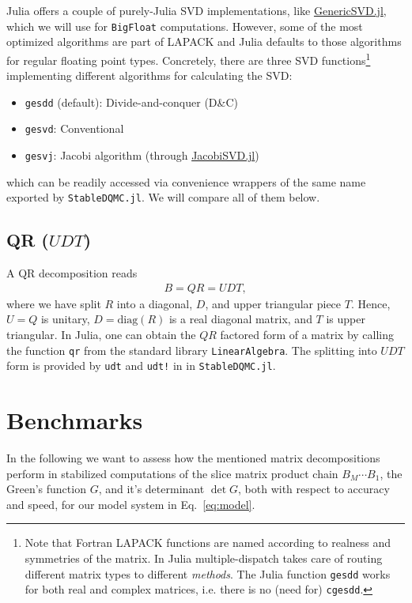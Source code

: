 \documentclass[%
 reprint,
superscriptaddress,
citeautoscript,
showpacs,
 amsmath,amssymb,
 aps,
 prb,
longbibliography,
]{revtex4-1}
\begin{document}
Julia offers a couple of purely-Julia SVD implementations, like \href{https://github.com/JuliaLinearAlgebra/GenericSVD.jl/}{GenericSVD.jl}, which we will use for \texttt{BigFloat} computations. However, some of the most optimized algorithms are part of LAPACK\cite{LAPACK} and Julia defaults to those algorithms for regular floating point types. Concretely, there are three SVD functions\footnote{Note that Fortran LAPACK functions are named according to realness and symmetries of the matrix. In Julia multiple-dispatch takes care of routing different matrix types to different \textit{methods}. The Julia function \texttt{gesdd} works for both real and complex matrices, i.e. there is no (need for) \texttt{cgesdd}.} implementing different algorithms for calculating the SVD:
\begin{itemize}
	\item \texttt{gesdd} (default): Divide-and-conquer (D\&C)
	\item \texttt{gesvd}: Conventional
	\item \texttt{gesvj}: Jacobi algorithm (through \href{https://github.com/RalphAS/JacobiSVD.jl}{JacobiSVD.jl})
\end{itemize}
which can be readily accessed via convenience wrappers of the same name exported by \texttt{StableDQMC.jl}. We will compare all of them below.

\subsection{QR ($UDT$)}
A QR decomposition reads
\begin{align}
B = QR = UDT,
\end{align}
where we have split $R$ into a diagonal, $D$, and upper triangular piece $T$. Hence, $U = Q$ is unitary, $D = \textrm{diag}(R)$ is a real diagonal matrix, and $T$ is upper triangular. In Julia, one can obtain the $QR$ factored form of a matrix by calling the function \texttt{qr} from the standard library \texttt{LinearAlgebra}. The splitting into $UDT$ form is provided by \texttt{udt} and \texttt{udt!} in in \texttt{StableDQMC.jl}.

\section{Benchmarks}

In the following we want to assess how the mentioned matrix decompositions perform in stabilized computations of the slice matrix product chain $B_M \cdots B_1$, the Green's function $G$, and it's determinant $\det G$, both with respect to accuracy and speed, for our model system in Eq.~\ref{eq:model}.
\end{document}
